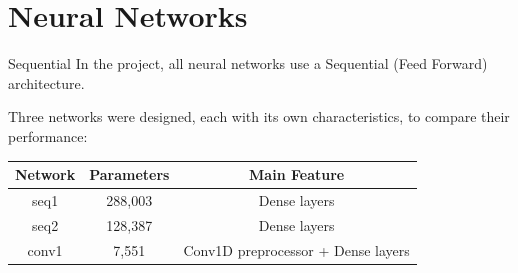 \documentclass[10pt, xcolor={dvipsnames}]{beamer}
\begin{document}


\section{Neural Networks}
\begin{frame}{Sequential}
    In the project, all neural networks use a \alert{Sequential} (Feed Forward) architecture.
    
    Three networks were designed, each with its own characteristics, to compare their performance:
    
    \vspace{0.5cm}
    \centering
    \begin{tabular}{ccc}
        \toprule
        \textbf{Network} & \textbf{Parameters} & \textbf{Main Feature} \\
        \midrule
        seq1  & 288,003 & Dense layers \\
        seq2  & 128,387 & Dense layers \\
        conv1 & 7,551 &  Conv1D preprocessor + Dense layers\\
        \bottomrule
    \end{tabular}
\end{frame}
\end{document}
